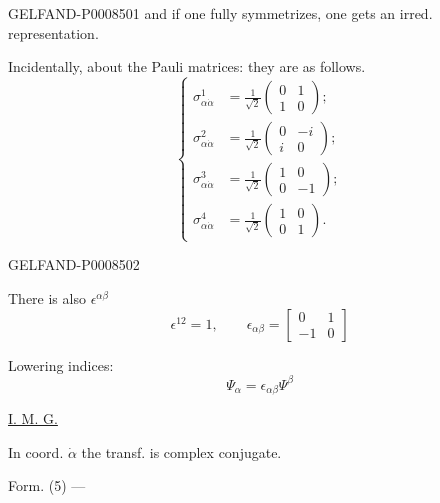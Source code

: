 \begin{GelfandAdjacentEvidence}{GELFAND-P000850}{1}
and if one fully symmetrizes, one gets an irred. representation.

Incidentally, about the Pauli matrices: they are as follows.
\[
\left\{\begin{aligned}
\sigma^1_{\alpha\dot\alpha}&=\frac{1}{\sqrt2}\begin{pmatrix}0&1\\1&0\end{pmatrix};\\
\sigma^2_{\alpha\dot\alpha}&=\frac{1}{\sqrt2}\begin{pmatrix}0&-i\\i&0\end{pmatrix};\\
\sigma^3_{\alpha\dot\alpha}&=\frac{1}{\sqrt2}\begin{pmatrix}1&0\\0&-1\end{pmatrix};\\
\sigma^4_{\alpha\dot\alpha}&=\frac{1}{\sqrt2}\begin{pmatrix}1&0\\0&1\end{pmatrix}.
\end{aligned}\right. \tag{7}
\]
\end{GelfandAdjacentEvidence}
\begin{GelfandAdjacentEvidence}{GELFAND-P000850}{2}


There is also \(\epsilon^{\alpha\beta}\)
\[
\epsilon^{12}=1,\qquad\epsilon_{\alpha\beta}=\begin{bmatrix}0&1\\-1&0\end{bmatrix} \tag{8}
\]

Lowering indices:
\[
\Psi_\alpha=\epsilon_{\alpha\beta}\Psi^\beta \tag{9}
\]

\uline{I. M. G.}

In coord. \(\dot\alpha\) the transf. is complex conjugate.

Form. (5) — 
\end{GelfandAdjacentEvidence}
